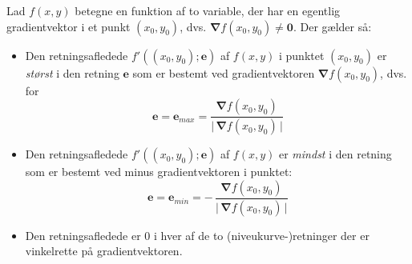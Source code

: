 \begin{theorem} \label{thmGradRetning}
Lad $f(x,y)$ betegne en funktion af to variable, der har en egentlig gradientvektor i et punkt $(x_{0}, y_{0})$, dvs. ${\bm{\nabla}}f(x_{0}, y_{0}) \neq \mathbf{0}$. Der gælder så:
\begin{itemize}
\item Den retningsafledede $f'((x_{0}, y_{0}); \mathbf{e})$ af $f(x,y)$ i punktet $(x_{0}, y_{0})$ er \emph{størst} i den retning $\mathbf{e}$ som er bestemt ved gradientvektoren ${\bm{\nabla}}f(x_{0}, y_{0})$, dvs. for
    \begin{equation}
    \mathbf{e} = \mathbf{e}_{\textit{max}} = \frac{{\bm{\nabla}}f(x_{0}, y_{0})}{{|\,\bm{\nabla}}f(x_{0}, y_{0})\,|}
    \end{equation}
\item    Den retningsafledede $f'((x_{0}, y_{0}); \mathbf{e})$  af $f(x,y)$ er \emph{mindst} i den retning som er bestemt ved minus gradientvektoren i punktet:
\begin{equation}
    \mathbf{e} = \mathbf{e}_{\textit{min}} = -\,\frac{{\bm{\nabla}}f(x_{0}, y_{0})}{{|\,\bm{\nabla}}f(x_{0}, y_{0})\,|}
    \end{equation}
\item Den retningsafledede er $0$ i hver af de to (niveukurve-)retninger der er vinkelrette på gradientvektoren.
\end{itemize}
\end{theorem}
